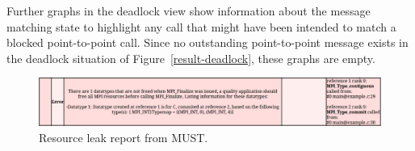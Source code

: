 \documentclass[english]{scrartcl}
\begin{document}
Further graphs in the deadlock view show information about the message
matching state to highlight any call that might have been intended to match a
blocked point-to-point call. Since no outstanding point-to-point message exists
in the deadlock situation of Figure~\ref{result-deadlock}, these graphs are
empty.

\begin{figure}[t]
  \centering
  \includegraphics[angle=0,width=0.99\linewidth]{resleak.pdf}
  \caption{Resource leak report from MUST.}
  \label{result-leak}
\end{figure}
%
% 
\end{document}
